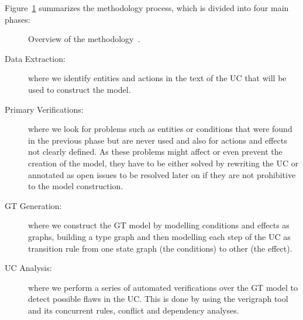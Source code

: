 Figure~\ref{fig:tests:methodology} summarizes the methodology process, which is divided into four main phases:

\begin{figure}[!ht]
  \centering
  \caption{Overview of the methodology~\cite{Junior2015}.}\label{fig:tests:methodology}
\end{figure}

\begin{description}
  \item[Data Extraction:] where we identify entities and actions in the text of the UC that will be used to construct the model.
  \item[Primary Verifications:] where we look for problems such as entities or conditions that were found in the previous phase but are never used and also for actions and effects not clearly defined. As these problems might affect or even prevent the creation of the model, they have to be either solved by rewriting the UC or annotated as open issues to be resolved later on if they are not prohibitive to the model construction.
  \item[GT Generation:] where we construct the GT model by modelling conditions and effects as graphs, building a type graph and then modelling each step of the UC as transition rule from one state graph (the conditions) to other (the effect).
  \item[UC Analysis:] where we perform a series of automated verifications over the GT model to detect possible flaws in the UC. This is done by using the verigraph tool  and its concurrent rules, conflict and dependency analyses.
\end{description}

